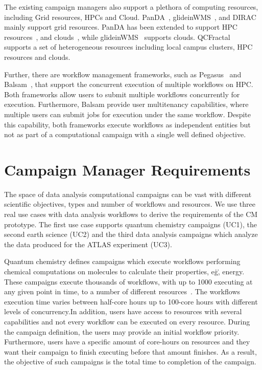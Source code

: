 The existing campaign managers also support a plethora of computing resources, 
including Grid resources, HPCs and Cloud. PanDA~\cite{maeno2008panda}, 
glideinWMS~\cite{sfiligoi2008glidein}, and DIRAC~\cite{casajus2010dirac} 
mainly support grid resources. PanDA has been extended to support HPC 
resources~\cite{de2015future, de2016accelerating}, and 
clouds~\cite{de2016accelerating}, while glideinWMS~\cite{sfiligoi2008glidein} 
supports clouds. QCFractal~\cite{qcfractal} supports a set of heterogeneous 
resources including local campus clusters, HPC resources and clouds.

Further, there are workflow management frameworks, such as 
Pegasus~\cite{deelman2015pegasus} and Balsam~\cite{salim2019balsam}, that 
support the concurrent execution of multiple workflows on HPC. Both frameworks 
allow users to submit multiple workflows concurrently for execution. 
Furthermore, Balsam provide user multitenancy capabilities, where multiple 
users can submit jobs for execution under the same workflow. Despite this 
capability, both frameworks execute workflows as independent entities but not 
as part of a computational campaign with a single well defined objective.

\section{Campaign Manager Requirements}
\label{sec:cm_req}

The space of data analysis computational campaigns can be vast with different 
scientific objectives, types and number of workflows and resources. We use 
three real use cases with data analysis workflows to derive the requirements 
of the CM prototype. The first use case supports quantum 
chemistry campaigns (UC1), the second earth science (UC2) and the third data 
analysis campaigns which analyze the data produced for the ATLAS 
experiment (UC3).

Quantum chemistry defines campaigns which execute workflows performing 
chemical computations on molecules to calculate their properties, e\.g\., 
energy. These campaigns execute thousands of workflows, with up to 1000 
executing at any given point in time, to a number of different 
resources~\cite{smith2020molssi}. The workflows execution time varies between 
half-core hours up to 100-core hours with different levels of concurrency.In 
addition, users have access to resources with several capabilities and not 
every workflow can be executed on every resource. During the campaign 
definition, the users may provide an initial workflow priority. Furthermore, 
users have a specific amount of core-hours on resources and they want their 
campaign to finish executing before that amount finishes. As a result, the 
objective of such campaigns is the total time to completion of the campaign.

